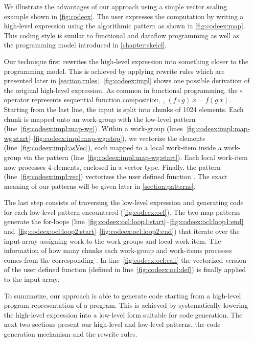We illustrate the advantages of our approach using a simple vector scaling example shown in \autoref{fig:codeex}.
The user expresses the computation by writing a high-level expression using the algorithmic  pattern as shown in \autoref{fig:codeex:map}.
This coding style is similar to functional and dataflow programming as well as the \SkelCL programming model introduced in \autoref{chapter:skelcl}.

Our technique first rewrites the high-level expression into something closer to the \OpenCL programming model.
This is achieved by applying rewrite rules which are presented later in \autoref{section:rules}.
\autoref{fig:codeex:impl} shows one possible derivation of the original high-level expression.
As common in functional programming, the $\circ$ operator represents sequential function composition, \ie, $(f \circ g)\ x = f(g\ x)$.
Starting from the last line, the input is split into chunks of 1024 elements.
Each chunk is mapped onto an \OpenCL work-group with the  low-level pattern (line~\ref{fig:codeex:impl:map-wg}).
Within a work-group (lines~\ref{fig:codeex:impl:map-wg:start}--\ref{fig:codeex:impl:map-wg:stop}), we vectorize the elements (line~\ref{fig:codeex:impl:asVec}), each mapped to a local work-item inside a work-group via the  pattern (line~\ref{fig:codeex:impl:map-wg:start}).
Each local work-item now processes 4 elements, enclosed in a vector type.
Finally, the  pattern (line~\ref{fig:codeex:impl:vec}) vectorizes the user defined function .
The exact meaning of our patterns will be given later in \autoref{section:patterns}.

The last step consists of traversing the low-level expression and generating \OpenCL code for each low-level pattern encountered (\autoref{fig:codeex:ocl}).
The two map patterns generate the for-loops (line~\ref{fig:codeex:ocl:loop1:start}--\ref{fig:codeex:ocl:loop1:end} and~\ref{fig:codeex:ocl:loop2:start}--\ref{fig:codeex:ocl:loop2:end}) that iterate over the input array assigning work to the work-groups and local work-item.
The information of how many chunks each work-group and work-items processes comes from the corresponding .
In line~\ref{fig:codeex:ocl:call} the vectorized version of the user defined  function (defined in line~\ref{fig:codeex:ocl:def}) is finally applied to the input array.

To summarize, our approach is able to generate \OpenCL code starting from a high-level program representation of a program.
This is achieved by systematically lowering the high-level expression into a low-level form suitable for code generation.
The next two sections present our high-level and low-level patterns, the code generation mechanism and the rewrite rules.


